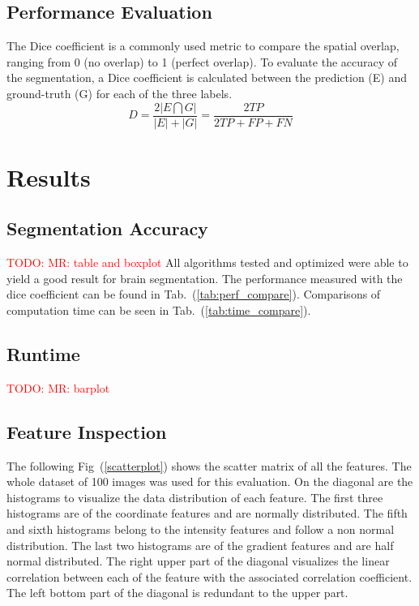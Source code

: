 \documentclass[journal]{IEEEtran}
\newcommand\TODO[1]{\textcolor{red}{TODO: #1}}
\begin{document}
\subsection{Performance Evaluation}\label{ch.eval}
The Dice coefficient is a commonly used metric to compare the spatial overlap, ranging from 0 (no overlap) to 1 (perfect overlap). To evaluate the accuracy of the segmentation, a Dice coefficient is calculated between the prediction (E) and ground-truth (G) for each of the three labels. 
\begin{equation}
D = \frac{2|E \bigcap G|}{|E| + |G|} = \frac{2 TP}{2 TP + FP + FN}
\end{equation}

\section{Results}
\subsection{Segmentation Accuracy}
\TODO{MR: table and boxplot}
All algorithms tested and optimized were able to yield a good result for brain segmentation. The performance measured with the dice coefficient can be found in Tab.~(\ref{tab:perf_compare}). Comparisons of computation time can be seen in Tab.~(\ref{tab:time_compare}).\\

\subsection{Runtime}
\TODO{MR: barplot}

\subsection{Feature Inspection}



The following Fig~(\ref{scatterplot}) shows the scatter matrix of all the features. The whole dataset of 100 images was used for this evaluation. On the diagonal are the histograms to visualize the data distribution of each feature. The first three histograms are of the coordinate features and are normally distributed. The fifth and sixth histograms belong to the intensity features and follow a non normal distribution. The last two histograms are of the gradient features and are half normal distributed. The right upper part of the diagonal visualizes the linear correlation between each of the feature with the associated correlation coefficient. The left bottom part of the diagonal is redundant to the upper part. 
\end{document}
